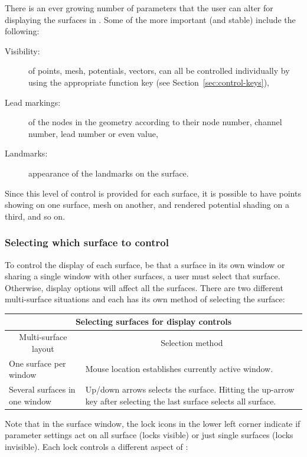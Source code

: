 There is an ever growing number of parameters that the user can alter
for displaying the surfaces in \map{}.  Some of the more important (and
stable) include the following:

\begin{description}
  \item [Visibility:] of points, mesh, potentials, vectors, \etc{} can all
        be controlled individually by using the appropriate function key
        (see Section~\ref{sec:control-keys}), 
      \item [Lead markings: ] of the nodes in the geometry according to
        their node number, channel number, lead number or even value,
  \item [Landmarks: ] appearance of the landmarks on the surface.
\end{description}

Since this level of control is provided for each surface, it is possible to
have points showing on one surface, mesh on another, and rendered potential
shading on a third, and so on. 

\subsubsection{Selecting which surface to control} 
\label{sec:locks} 

To control the display of each surface, be that a surface in its own window
or sharing a single window with other surfaces, a user must select that
surface.  Otherwise, display options will affect all the surfaces.  There
are two different multi-surface situations and each has its own method of
selecting the surface:
%
\begin{center}
  \begin{tabular}{|l|p{3in}|}\hline
    \multicolumn{2}{|c|}{Selecting surfaces for display controls} \\ \hline
    \multicolumn{1}{|c|}{Multi-surface layout} & 
    \multicolumn{1}{c|}{Selection method} \\ \hline
    One surface per window & Mouse location establishes currently active
    window. \\
    Several surfaces in one window & Up/down arrows selects the surface.
    Hitting 
    the up-arrow key after selecting the last surface selects all surface. \\
    \hline 
  \end{tabular}
\end{center}

Note that in the surface window, the lock icons in the lower left corner
indicate if parameter settings act on all surface (locks visible) or just
single surfaces (locks invisible).  Each lock controls a different aspect of 
\map{}:

